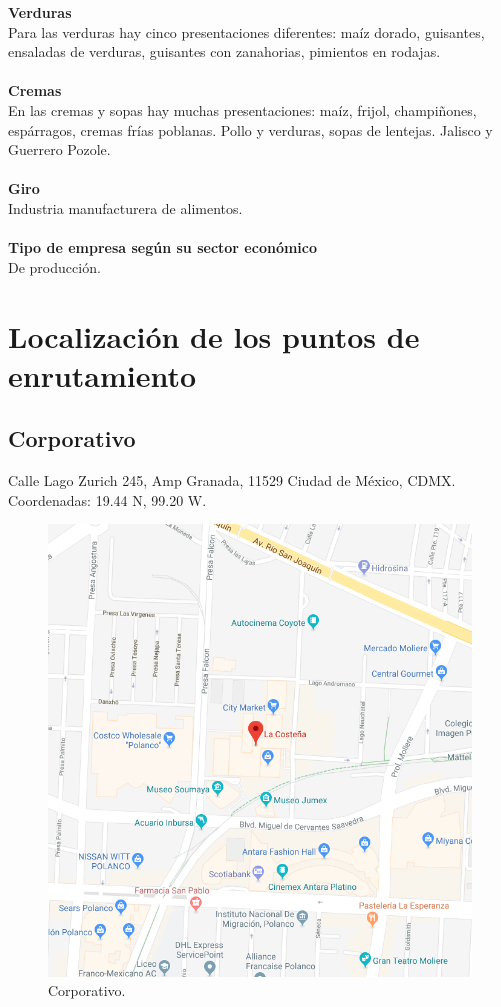 \documentclass[12pt,letterpaper]{article}
\begin{document}
\textbf{Verduras} 
\\
Para las verduras hay cinco presentaciones diferentes: maíz dorado, guisantes, ensaladas de verduras, guisantes con zanahorias, pimientos en rodajas.
\\ \\
\textbf{Cremas} 
\\
En las cremas y sopas hay muchas presentaciones: maíz, frijol, champiñones, espárragos, cremas frías poblanas. Pollo y verduras, sopas de lentejas. Jalisco y Guerrero Pozole.
\\ \\
\textbf{Giro} 
\\
Industria manufacturera de alimentos.
\\ \\
\textbf{Tipo de empresa según su sector económico} 
\\
De producción.

\newpage
\section{Localización de los puntos de enrutamiento}

\subsection{Corporativo}
Calle Lago Zurich 245, Amp Granada, 11529 Ciudad de México, CDMX.
\\ Coordenadas: 19.44 N, 99.20 W.
\begin{figure}[ht]
    \centering
    \includegraphics[width=.8\textwidth]{imagenes/corporativo.png}
    \caption{Corporativo.}
\end{figure}
\end{document}
